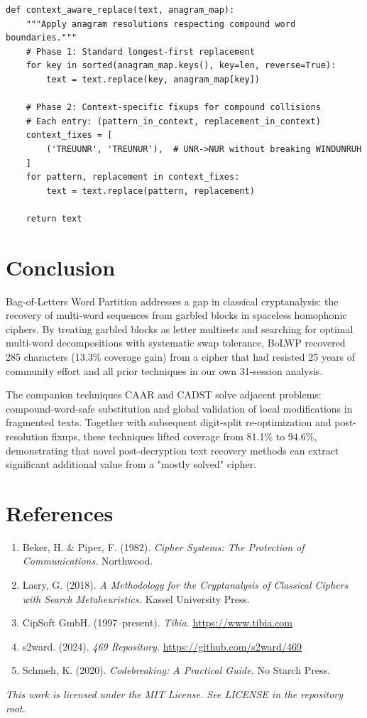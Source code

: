 \documentclass[11pt,a4paper]{article}
\begin{document}
\begin{lstlisting}[style=python]
def context_aware_replace(text, anagram_map):
    """Apply anagram resolutions respecting compound word boundaries."""
    # Phase 1: Standard longest-first replacement
    for key in sorted(anagram_map.keys(), key=len, reverse=True):
        text = text.replace(key, anagram_map[key])

    # Phase 2: Context-specific fixups for compound collisions
    # Each entry: (pattern_in_context, replacement_in_context)
    context_fixes = [
        ('TREUUNR', 'TREUNUR'),  # UNR->NUR without breaking WINDUNRUH
    ]
    for pattern, replacement in context_fixes:
        text = text.replace(pattern, replacement)

    return text
\end{lstlisting}

\section{Conclusion}

Bag-of-Letters Word Partition addresses a gap in classical cryptanalysis: the recovery of multi-word sequences from garbled blocks in spaceless homophonic ciphers. By treating garbled blocks as letter multisets and searching for optimal multi-word decompositions with systematic swap tolerance, BoLWP recovered 285 characters (13.3\% coverage gain) from a cipher that had resisted 25 years of community effort and all prior techniques in our own 31-session analysis.

The companion techniques CAAR and CADST solve adjacent problems: compound-word-safe substitution and global validation of local modifications in fragmented texts. Together with subsequent digit-split re-optimization and post-resolution fixups, these techniques lifted coverage from 81.1\% to 94.6\%, demonstrating that novel post-decryption text recovery methods can extract significant additional value from a "mostly solved" cipher.

\section*{References}

\begin{enumerate}
\item Beker, H. \& Piper, F. (1982). \textit{Cipher Systems: The Protection of Communications.} Northwood.
\item Lasry, G. (2018). \textit{A Methodology for the Cryptanalysis of Classical Ciphers with Search Metaheuristics.} Kassel University Press.
\item CipSoft GmbH. (1997–present). \textit{Tibia.} \url{https://www.tibia.com}
\item s2ward. (2024). \textit{469 Repository.} \url{https://github.com/s2ward/469}
\item Schmeh, K. (2020). \textit{Codebreaking: A Practical Guide.} No Starch Press.
\end{enumerate}

\vfill
\begin{center}
\textit{This work is licensed under the MIT License. See LICENSE in the repository root.}
\end{center}
\end{document}
